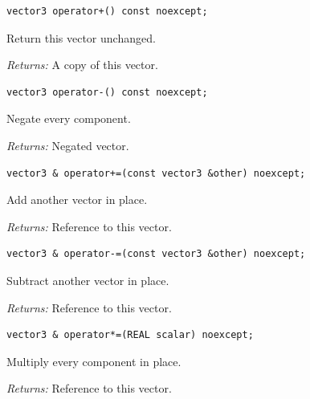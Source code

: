 \par\noindent\begin{minipage}{\linewidth}
\begin{lstlisting}[style=apireference]
vector3 operator+() const noexcept;
\end{lstlisting}
{\footnotesize Return this vector unchanged.\par}
{\footnotesize\textit{Returns:} A copy of this vector.\par}
\end{minipage}\par\vspace{1pt}
\par\noindent\begin{minipage}{\linewidth}
\begin{lstlisting}[style=apireference]
vector3 operator-() const noexcept;
\end{lstlisting}
{\footnotesize Negate every component.\par}
{\footnotesize\textit{Returns:} Negated vector.\par}
\end{minipage}\par\vspace{1pt}
\par\noindent\begin{minipage}{\linewidth}
\begin{lstlisting}[style=apireference]
vector3 & operator+=(const vector3 &other) noexcept;
\end{lstlisting}
{\footnotesize Add another vector in place.\par}
{\footnotesize\textit{Returns:} Reference to this vector.\par}
\end{minipage}\par\vspace{1pt}
\par\noindent\begin{minipage}{\linewidth}
\begin{lstlisting}[style=apireference]
vector3 & operator-=(const vector3 &other) noexcept;
\end{lstlisting}
{\footnotesize Subtract another vector in place.\par}
{\footnotesize\textit{Returns:} Reference to this vector.\par}
\end{minipage}\par\vspace{1pt}
\par\noindent\begin{minipage}{\linewidth}
\begin{lstlisting}[style=apireference]
vector3 & operator*=(REAL scalar) noexcept;
\end{lstlisting}
{\footnotesize Multiply every component in place.\par}
{\footnotesize\textit{Returns:} Reference to this vector.\par}
\end{minipage}\par\vspace{1pt}
